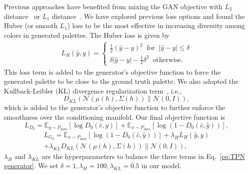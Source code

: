 \documentclass[runningheads]{llncs}
\begin{document}
Previous approaches have benefited from mixing the GAN objective with $L_2$ distance~\cite{pathak2016context} or $L_1$ distance~\cite{isola2017image}. We have explored previous loss options and found the Huber (or smooth $L_1$) loss to be the most effective in increasing diversity among colors in generated palettes. The Huber loss is given by
\begin{equation}
\begin{aligned}
L_{H}(\hat{y},y)=\begin{cases}
\frac{1}{2}(\hat{y}-y)^{2}\;\;\mathrm{for}\;\;\left|\hat{y}-y\right|\leq\delta\\
\delta\left|\hat{y}-y\right|-\frac{1}{2}\delta^{2}\;\;\mathrm {otherwise}.
\end{cases}
\end{aligned}
\end{equation}
This loss term is added to the generator's objective function to force the generated palette to be close to the ground truth palette. We also adopted the Kullback-Leibler (KL) divergence regularization term~\cite{zhang2017stackgan}, i.e., 
\begin{equation}
D_{KL}(\mathcal{N}(\mu(h),\Sigma(h))\parallel\mathcal{N}(0,I)), 
\end{equation}
which is added to the generator's objective function to further enforce the smoothness over the conditioning manifold. Our final objective function is
\begin{equation}
L_{D_{0}}=\mathbb{E_{\mathit{y\sim P_{data}}}}[\log D_{0}(\bar{c},y)]+\mathbb{E_{\mathrm{\mathit{x\sim P_{data}}}}\mathrm{[\log(1-\mathit{D_{0}}(\mathit{\bar{c},\hat{y}}))],}}
\end{equation}
\begin{equation}
\label{eq:TPN generator}
\begin{aligned}
L_{G_{0}}=\mathbb{E_{\mathit{x\sim P_{data}}}}[\log(1-\mathit{D}_{0}(\mathit{\bar{c},\hat{y}}))]+\lambda_{H}L_{H}(\hat{y},y)\\+\lambda_{KL}D_{KL}(\mathcal{N}(\mu(h),\Sigma(h))\parallel\mathcal{N}(0,I)),
\end{aligned}
\end{equation}
$\lambda_{H}$ and $\lambda_{KL}$ are the hyperparameters to balance the three terms in Eq.~\ref{eq:TPN generator}. We set $\delta=1,\lambda_{H}=100,\lambda_{KL}=0.5$ in our model.
\end{document}
